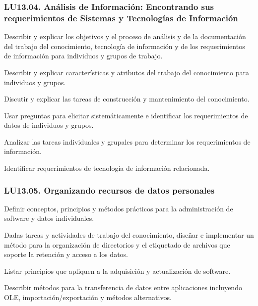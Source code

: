 \subsubsection{LU13.04. Análisis de Información: Encontrando sus requerimientos de Sistemas y Tecnologías de Información}\label{sec:LU13.04}
\begin{LearningUnit}
\begin{LUGoal}
\item Describir y explicar los objetivos y el proceso de análisis y de la documentación del trabajo del conocimiento, tecnología de información y de los requerimientos de información para individuos y grupos de trabajo.
\end{LUGoal}

\begin{LUObjective}
\item Describir y explicar características y atributos del trabajo del conocimiento para individuos y grupos.
\item Discutir y explicar las tareas de construcción y mantenimiento del conocimiento.
\item Usar preguntas para elicitar sistemáticamente e identificar los requerimientos de datos de individuos y grupos.
\item Analizar las tareas individuales y grupales para determinar los requerimientos de información.
\item Identificar requerimientos de tecnología de información relacionada.
\end{LUObjective}
\end{LearningUnit}

\subsubsection{LU13.05. Organizando recursos de datos personales}\label{sec:LU13.05}
\begin{LearningUnit}
\begin{LUGoal}
\item Definir conceptos, principios y métodos prácticos para la administración de software y datos individuales.
\end{LUGoal}

\begin{LUObjective}
\item Dadas tareas y actividades de trabajo del conocimiento, diseñar e implementar un método para la organización de directorios y el etiquetado de archivos que soporte la retención y acceso a los datos.
\item Listar principios que apliquen a la adquisición y actualización de software.
\item Describir métodos para la transferencia de datos entre aplicaciones incluyendo OLE, importación/exportación y métodos alternativos.
\end{LUObjective}
\end{LearningUnit}

